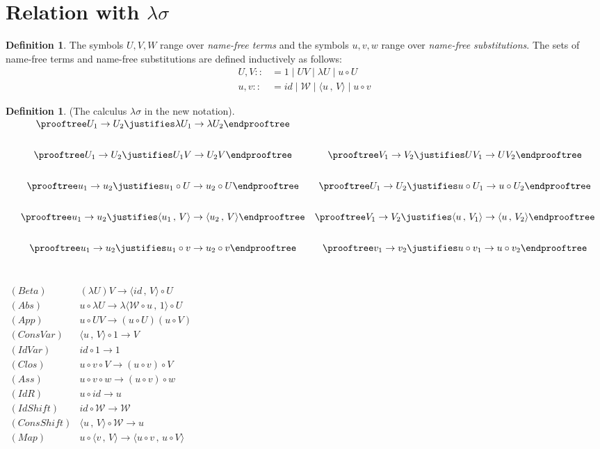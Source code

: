 \documentclass[11pt]{amsart}
\def\ruleone#1#2{\prooftree #1 \justifies #2 \endprooftree}
\theoremstyle{plain}
\theoremstyle{definition}
\newtheorem{definition}[theorem]{Definition}
\theoremstyle{remark}
\numberwithin{equation}{section}
\newcommand{\ci}{\circ}
\newcommand{\mi}{\,,\,}
\newcommand{\arrow}{\rightarrow}
\renewcommand{\pi}{\mathcal{W}}
\begin{document}
\section{Relation with $\lambda\sigma$}
\begin{definition} The symbols $U,V,W$ range over \emph{name-free
terms} and the symbols $u,v,w$  range over \emph{name-free
substitutions}. The sets of name-free terms and name-free
substitutions are defined inductively as follows:
\begin{align*}
U,V::&= 1 \mid UV \mid \lambda U \mid u\ci U \\
u,v::&= id \mid \pi \mid \langle u\mi V \rangle \mid u\ci v
\end{align*}
\end{definition}
\begin{definition}(The calculus $\lambda\sigma$ in the new notation).\\[10pt]
$
\begin{array}{ccc}
& \ruleone{ U_1\arrow U_2}{ \lambda
U_1\arrow\lambda U_2} &\\[20pt]
& \ruleone{ U_1\arrow U_2}{ U_1V\arrow U_2V} & \ruleone{ V_1\arrow
V_2}{
UV_1\arrow UV_2}\\[20pt]
& \ruleone{ u_1\arrow u_2}{u_1\ci U\arrow u_2\ci U} & \ruleone{
U_1\arrow
U_2}{u\ci U_1\arrow u\ci U_2}\\[20pt]
& \ruleone{ u_1\arrow u_2}{ \langle u_1\mi V \rangle\arrow \langle
u_2\mi V\rangle} & \ruleone{ V_1\arrow V_2}{ \langle u\mi V_1
\rangle\arrow \langle
u\mi V_2\rangle}\\[20pt]
& \ruleone{ u_1\arrow u_2}{ u_1\ci v\arrow u_2\ci v} & \ruleone{
v_1\arrow v_2}{ u\ci v_1\arrow u\ci
v_2}\\[20pt]
\end{array}
$

$
\begin{array}{lll}
(Beta) & (\lambda U)V\rightarrow \langle id\mi V\rangle\ci U &\\
(Abs) & u\ci \lambda U\rightarrow\lambda \langle \pi\ci u\mi
1\rangle\ci U &\\
(App) & u\ci UV\rightarrow(u\ci U)(u\ci  V) &\\
(ConsVar) & \langle u\mi V\rangle\ci 1\rightarrow V &\\
(IdVar) &  id\ci 1\rightarrow 1 &\\
(Clos) & u\ci v\ci V\rightarrow (u\ci v)\ci V &\\
(Ass) & u\ci v\ci  w\rightarrow (u\ci v)\ci w &\\
(IdR) & u\ci id\rightarrow u &\\
(IdShift) & id\ci \pi\rightarrow\pi &\\
(ConsShift) & \langle u\mi V\rangle\ci \pi\rightarrow u &\\
(Map) & u\ci \langle v\mi V\rangle\rightarrow\langle u\ci v \mi
u\ci V\rangle &
\end{array}
$\\[5pt]
\end{definition}
\end{document}
